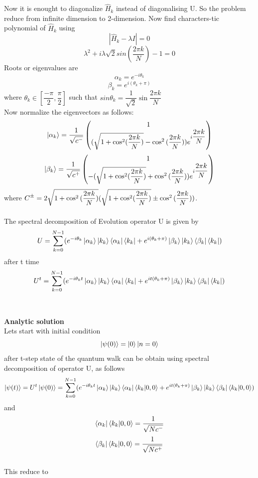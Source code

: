 \documentclass[11 pt]{article}
\theoremstyle{definition}
\theoremstyle{remark}
\newcommand{\di}{i}
\newcommand{\rpm}{\sbox0{$1$}\sbox2{$\scriptstyle\pm$}
  \raise\dimexpr(\ht0-\ht2)/2\relax\box2 }
\begin{document}
Now it is enought to diagonalize $\hat{H}_k$ instead of diagonalising U. So the problem reduce from infinite dimension to 2-dimension. Now find characters-tic polynomial of $\hat{H}_k$ using
$$|\hat{H}_k - \lambda I| = 0$$
$$\lambda^2 + \di\lambda\sqrt{2}sin(\dfrac{2\pi k}{N}) -1 = 0$$
Roots or eigenvalues are 
$$\alpha_k = e^{-\di \theta_k}$$
$$\beta_k = e^{\di (\theta_k + \pi)}$$
where $\theta_k \in [\dfrac{-\pi}{2},\dfrac{\pi}{2}]$ such that $sin\theta_k = \dfrac{1}{\sqrt{2}}\sin{\dfrac{2\pi k}{N}}$\\
Now normalize the eigenvectors as follows:
$$\ket{\alpha_k} = \dfrac{1}{\sqrt{c^{-}}}\begin{pmatrix}
           1\\
           (\sqrt{1+\cos^2({\dfrac{2\pi k}{N}})} - \cos^2{(\dfrac{2\pi k}{N})})e^{\di\dfrac{2\pi k}{N}}
\end{pmatrix}$$
$$\ket{\beta_k} = \dfrac{1}{\sqrt{c^{+}}}\begin{pmatrix}
           1\\
           -(\sqrt{1+\cos^2({\dfrac{2\pi k}{N}})} + \cos^2{(\dfrac{2\pi k}{N})})e^{\di\dfrac{2\pi k}{N}}
\end{pmatrix}$$
where $C^{\rpm} = 2\sqrt{1+\cos^2{(\dfrac{2\pi k}{N})} }(\sqrt{1+\cos^2({\dfrac{2\pi k}{N}})} \pm \cos^2{(\dfrac{2\pi k}{N})})$.
\\
\\
The spectral decomposition of Evolution operator U is given by
$$U = \sum_{k=0}^{N-1}(e^{-\di\theta_k}\ket{\alpha_k}\ket{k_k}\bra{\alpha_k}\bra{k_k} + e^{\di(\theta_k+\pi)}\ket{\beta_k}\ket{k_k}\bra{\beta_k}\bra{k_k})$$
after t time
$$U^t = \sum_{k=0}^{N-1}(e^{-\di\theta_k t}\ket{\alpha_k}\ket{k_k}\bra{\alpha_k}\bra{k_k} + e^{\di t(\theta_k+\pi)}\ket{\beta_k}\ket{k_k}\bra{\beta_k}\bra{k_k})$$
\\
\\
\textbf{Analytic solution }\\

Lets start with initial condition $$\ket{\psi(0)} = \ket{0}\ket{n=0}$$
after t-step state of the quantum walk can be obtain using spectral decomposition of operator U, as follows
$$\ket{\psi(t)} = U^t\ket{\psi(0)} = \sum_{k=0}^{N-1}(e^{-\di\theta_k t}\ket{\alpha_k}\ket{k_k}\bra{\alpha_k}\bra{k_k}\ket{0,0} + e^{\di t(\theta_k+\pi)}\ket{\beta_k}\ket{k_k}\bra{\beta_k}\bra{k_k}\ket{0,0})$$
and 
$$\bra{\alpha_k}\bra{k_k}\ket{0,0} = \dfrac{1}{\sqrt{Nc^{-}}}$$
$$\bra{\beta_k}\bra{k_k}\ket{0,0} = \dfrac{1}{\sqrt{Nc^{+}}}$$
\\
This reduce to 
\end{document}
